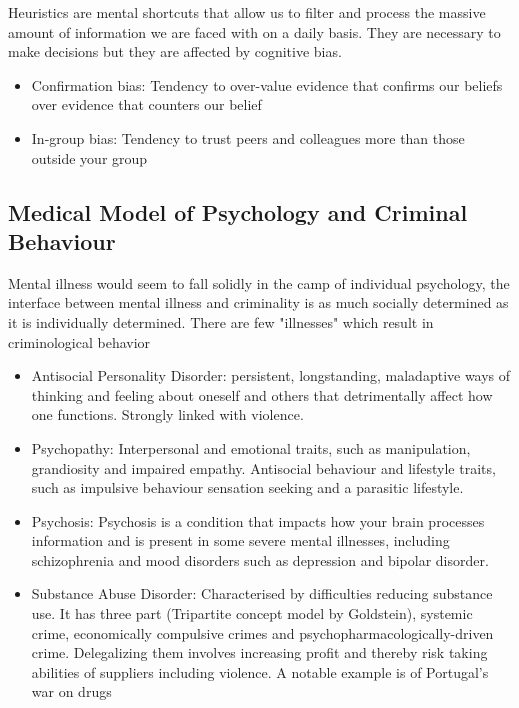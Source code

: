 \documentclass[11pt]{article}
\begin{document}
Heuristics are mental shortcuts that allow us to filter and process the massive amount of information we are faced with on a daily basis. They are necessary to make decisions but they are affected by cognitive bias.
\begin{itemize}
    \item Confirmation bias: Tendency to over-value evidence that confirms our beliefs over evidence that counters our belief
	
    \item In-group bias: Tendency to trust peers and colleagues more than those outside your group
\end{itemize}

\subsection{Medical Model of Psychology and Criminal Behaviour}

Mental illness would seem to fall solidly in the camp of individual psychology, the interface between mental illness and criminality is as much socially determined as it is individually determined. There are few "illnesses" which result in criminological behavior
\begin{itemize}
    \item Antisocial Personality Disorder: persistent, longstanding, maladaptive ways of thinking and feeling about oneself and others that detrimentally affect how one functions. Strongly linked with violence.
    
    \item Psychopathy: Interpersonal and emotional traits, such as manipulation, grandiosity and impaired empathy. Antisocial behaviour and lifestyle traits, such as impulsive behaviour sensation seeking and a parasitic lifestyle.
    
    \item Psychosis: Psychosis is a condition that impacts how your brain processes information and is present in some severe mental illnesses, including schizophrenia and mood disorders such as depression and bipolar disorder.
    
    \item  Substance Abuse Disorder: Characterised by difficulties reducing substance use. It has three part (Tripartite concept model by Goldstein), systemic crime, economically compulsive crimes and psychopharmacologically-driven crime. Delegalizing them involves increasing profit and thereby risk taking abilities of suppliers including violence. A notable example is of Portugal's war on drugs
\end{itemize}
\end{document}
